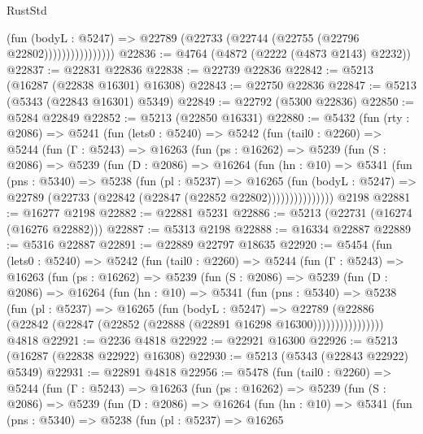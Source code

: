 \begin{lexlean}{RustStd}
\begin{coremodule}
                          (fun (bodyL : @5247) =>
                          @22789 (@22733 (@22744 (@22755 (@22796 @22802))))))))))))))))
@22836 := @4764 (@4872 (@2222 (@4873 @2143) @2232))
@22837 := @22831 @22836
@22838 := @22739 @22836
@22842 := @5213 (@16287 (@22838 @16301) @16308)
@22843 := @22750 @22836
@22847 := @5213 (@5343 (@22843 @16301) @5349)
@22849 := @22792 (@5300 @22836)
@22850 := @5284 @22849
@22852 := @5213 (@22850 @16331)
@22880 := @5432
    (fun (rty : @2086) =>
    @5241
      (fun (lets0 : @5240) =>
      @5242
        (fun (tail0 : @2260) =>
        @5244
          (fun (Γ : @5243) =>
          @16263
            (fun (ps : @16262) =>
            @5239
              (fun (S : @2086) =>
              @5239
                (fun (D : @2086) =>
                @16264
                  (fun (hn : @10) =>
                  @5341
                    (fun (pns : @5340) =>
                    @5238
                      (fun (pl : @5237) =>
                      @16265
                        (fun (bodyL : @5247) =>
                        @22789 (@22733 (@22842 (@22847 (@22852 @22802)))))))))))))))
    @2198
@22881 := @16277 @2198
@22882 := @22881 @5231
@22886 := @5213 (@22731 (@16274 (@16276 @22882)))
@22887 := @5313 @2198
@22888 := @16334 @22887
@22889 := @5316 @22887
@22891 := @22889 @22797 @18635
@22920 := @5454
    (fun (lets0 : @5240) =>
    @5242
      (fun (tail0 : @2260) =>
      @5244
        (fun (Γ : @5243) =>
        @16263
          (fun (ps : @16262) =>
          @5239
            (fun (S : @2086) =>
            @5239
              (fun (D : @2086) =>
              @16264
                (fun (hn : @10) =>
                @5341
                  (fun (pns : @5340) =>
                  @5238
                    (fun (pl : @5237) =>
                    @16265
                      (fun (bodyL : @5247) =>
                      @22789
                        (@22886
                          (@22842 (@22847 (@22852 (@22888 (@22891 @16298 @16300))))))))))))))))
    @4818
@22921 := @2236 @4818
@22922 := @22921 @16300
@22926 := @5213 (@16287 (@22838 @22922) @16308)
@22930 := @5213 (@5343 (@22843 @22922) @5349)
@22931 := @22891 @4818
@22956 := @5478
    (fun (tail0 : @2260) =>
    @5244
      (fun (Γ : @5243) =>
      @16263
        (fun (ps : @16262) =>
        @5239
          (fun (S : @2086) =>
          @5239
            (fun (D : @2086) =>
            @16264
              (fun (hn : @10) =>
              @5341
                (fun (pns : @5340) =>
                @5238
                  (fun (pl : @5237) =>
                  @16265

\end{coremodule}
\end{lexlean}
